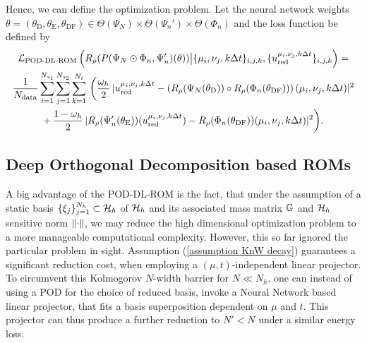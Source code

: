 Hence, we can define the optimization problem. Let the neural network weights $\theta = 
(\theta_\text{D}, \theta_\text{E}, \theta_\text{DF}) 
\in \Theta(\Psi_N) \times \Theta(\Psi_n') \times \Theta(\Phi_n)$ and the loss function be defined by
\begin{multline} \label{eq: loss function pod dl rom}
    \mathcal{L}_\text{POD-DL-ROM}\left(R_\rho(P(\Psi_N \odot \Phi_n, \Psi'_n)(\theta)) \big\vert \{\mu_i, \nu_j, k \Delta t\}_{i,j,k}, 
    \{u_\text{red}^{\mu_i, \nu_j, k \Delta t} \}_{i,j,k}\right) =  \\
        \frac{1}{N_\text{data}} \sum_{i=1}^{N_{s_1}} \sum_{j=1}^{N_{s_2}} 
        \sum_{k = 1}^{N_t} \, \bigg( \frac{\omega_h}{2} \, 
        \lvert u_\text{red}^{\mu_i, \nu_j, k \Delta t} - 
        \left(R_\rho(\Psi_N(\theta_\text{D})) \circ R_\rho(\Phi_n(\theta_\text{DF}))\right) (\mu_i, \nu_j, k \Delta t) \rvert^2 \\
        + \, \frac{1 - \omega_h}{2} \, \lvert R_\rho(\Psi'_n(\theta_\text{E}))(u_\text{red}^{\mu_i, \nu_j, k \Delta t}) 
        - R_\rho(\Phi_n(\theta_\text{DF}))(\mu_i, \nu_j, k \Delta t) \rvert^2 \bigg).
\end{multline}



\subsection{Deep Orthogonal Decomposition based ROMs} \label{subsec: dod-based roms}





A big advantage of the POD-DL-ROM is the fact, that under the assumption of a static basis 
$\{\xi_j\}_{j=1}^{N_h} \subset \mathcal{H}_h$ of $\mathcal{H}_h$ and its associated mass matrix $\mathbb{G}$ and $\mathcal{H}_h$ sensitive norm
$\lVert \cdot \rVert$, we may reduce the high dimensional optimization problem to a more manageable
computational complexity.
However, this so far ignored the particular problem in sight. Assumption (\ref{assumption KnW decay})
guarantees a significant reduction cost, when employing a $(\mu, t)$-independent linear projector.
To circumvent this Kolmogorov $N$-width barrier for $N \ll N_h$, one can instead of using a POD for the choice of reduced basis,
invoke a Neural Network based linear projector, that fits a basis superposition dependent on $\mu$ and $t$.
This projector can thus produce a further reduction to $N' < N$ under a similar energy loss.

